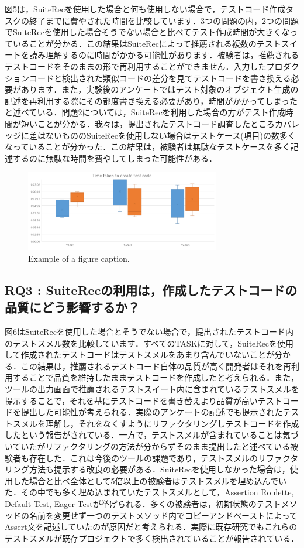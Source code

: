 \documentclass[conference]{IEEEtran}
\begin{document}
図5は，SuiteRecを使用した場合と何も使用しない場合で，テストコード作成タスクの終了までに費やされた時間を比較しています．3つの問題の内，2つの問題でSuiteRecを使用した場合そうでない場合と比べてテスト作成時間が大きくなっていることが分かる．この結果はSuiteRecによって推薦される複数のテストスイートを読み理解するのに時間がかかる可能性があります．被験者は，推薦されるテストコードをそのままの形で再利用することができません．入力したプロダクションコードと検出された類似コードの差分を見てテストコードを書き換える必要があります．また，実験後のアンケートではテスト対象のオブジェクト生成の記述を再利用する際にその都度書き換える必要があり，時間がかかってしまったと述べている．問題2については，SuiteRecを利用した場合の方がテスト作成時間が短いことが分かる．我々は，提出されたテストコード調査したところカバレッジに差はないもののSuiteRecを使用しない場合はテストケース(項目)の数多くなっていることが分かった．この結果は，被験者は無駄なテストケースを多く記述するのに無駄な時間を費やしてしまった可能性がある．
\begin{figure}[htbp]
\centerline{\includegraphics[width=8.5cm]{time.pdf}}
\caption{Example of a figure caption.}
\label{fig}
\end{figure}

\subsection{RQ3 : SuiteRecの利用は，作成したテストコードの品質にどう影響するか？}

図6はSuiteRecを使用した場合とそうでない場合で，提出されたテストコード内のテストスメル数を比較しています．すべてのTASKに対して，SuiteRecを使用して作成されたテストコードはテストスメルをあまり含んでいないことが分かる．この結果は，推薦されるテストコード自体の品質が高く開発者はそれを再利用することで品質を維持したままテストコードを作成したと考えられる．また，ツールの出力画面で推薦されるテストスイート内に含まれているテストスメルを提示することで，それを基にテストコードを書き替えより品質が高いテストコードを提出した可能性が考えられる．実際のアンケートの記述でも提示されたテストスメルを理解し，それをなくすようにリファクタリングしテストコードを作成したという報告がされている．一方で，テストスメルが含まれていることは気づいていたがリファクタリングの方法が分からずそのまま提出したと述べている被験者も存在した．これは今後のツールの課題であり，テストスメルのリファクタリング方法も提示する改良の必要がある．SuiteRecを使用しなかった場合は，使用した場合と比べ全体として5倍以上の被験者はテストスメルを埋め込んでいた．その中でも多く埋め込まれていたテストスメルとして，Assertion Roulette, Default Test, Eager Testが挙げられる．多くの被験者は，初期状態のテストメソッドの名前を変更せず一つのテストメソッド内でコピーアンドペーストによってAssert文を記述していたのが原因だと考えられる．実際に既存研究でもこれらのテストスメルが既存プロジェクトで多く検出されていることが報告されている． 
\end{document}

